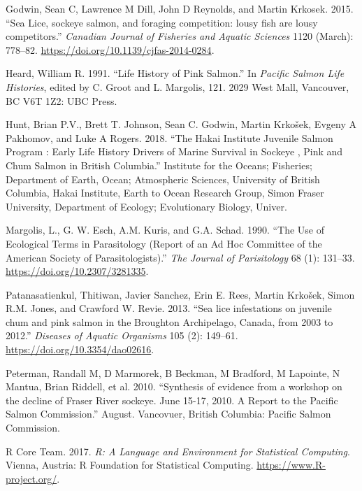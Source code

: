 \documentclass[fleqn,10pt]{wlpeerj} %
\begin{document}
\leavevmode\hypertarget{ref-Godwin2015}{}%
Godwin, Sean C, Lawrence M Dill, John D Reynolds, and Martin Krkosek. 2015. ``Sea Lice, sockeye salmon, and foraging competition: lousy fish are lousy competitors.'' \emph{Canadian Journal of Fisheries and Aquatic Sciences} 1120 (March): 778--82. \url{https://doi.org/10.1139/cjfas-2014-0284}.

\leavevmode\hypertarget{ref-Heard1991}{}%
Heard, William R. 1991. ``Life History of Pink Salmon.'' In \emph{Pacific Salmon Life Histories}, edited by C. Groot and L. Margolis, 121. 2029 West Mall, Vancouver, BC V6T 1Z2: UBC Press.

\leavevmode\hypertarget{ref-Hunt2018}{}%
Hunt, Brian P.V., Brett T. Johnson, Sean C. Godwin, Martin Krkošek, Evgeny A Pakhomov, and Luke A Rogers. 2018. ``The Hakai Institute Juvenile Salmon Program : Early Life History Drivers of Marine Survival in Sockeye , Pink and Chum Salmon in British Columbia.'' Institute for the Oceans; Fisheries; Department of Earth, Ocean; Atmospheric Sciences, University of British Columbia, Hakai Institute, Earth to Ocean Research Group, Simon Fraser University, Department of Ecology; Evolutionary Biology, Univer.

\leavevmode\hypertarget{ref-Margolis1990}{}%
Margolis, L., G. W. Esch, A.M. Kuris, and G.A. Schad. 1990. ``The Use of Ecological Terms in Parasitology (Report of an Ad Hoc Committee of the American Society of Parasitologists).'' \emph{The Journal of Parisitology} 68 (1): 131--33. \url{https://doi.org/10.2307/3281335}.

\leavevmode\hypertarget{ref-Patanasatienkul2013}{}%
Patanasatienkul, Thitiwan, Javier Sanchez, Erin E. Rees, Martin Krkošek, Simon R.M. Jones, and Crawford W. Revie. 2013. ``Sea lice infestations on juvenile chum and pink salmon in the Broughton Archipelago, Canada, from 2003 to 2012.'' \emph{Diseases of Aquatic Organisms} 105 (2): 149--61. \url{https://doi.org/10.3354/dao02616}.

\leavevmode\hypertarget{ref-Peterman2010}{}%
Peterman, Randall M, D Marmorek, B Beckman, M Bradford, M Lapointe, N Mantua, Brian Riddell, et al. 2010. ``Synthesis of evidence from a workshop on the decline of Fraser River sockeye. June 15-17, 2010. A Report to the Pacific Salmon Commission.'' August. Vancovuer, British Columbia: Pacific Salmon Commission.

\leavevmode\hypertarget{ref-R}{}%
R Core Team. 2017. \emph{R: A Language and Environment for Statistical Computing}. Vienna, Austria: R Foundation for Statistical Computing. \url{https://www.R-project.org/}.
\end{document}
